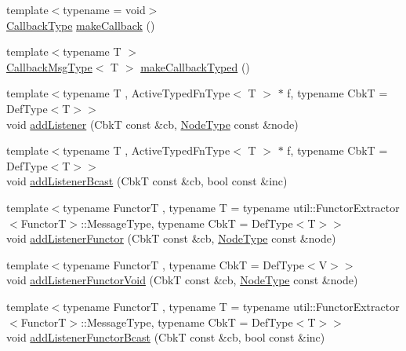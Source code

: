 \begin{DoxyCompactItemize}
\item 
{\footnotesize template$<$typename  = void$>$ }\\\hyperlink{structvt_1_1pipe_1_1_pipe_manager_t_l_a1cc1d0f1c80a36488f9b5d282e9755d2}{Callback\+Type} \hyperlink{structvt_1_1pipe_1_1_pipe_manager_t_l_aff965bd75d398d45ad11d33feeb7a7c5}{make\+Callback} ()
\item 
{\footnotesize template$<$typename T $>$ }\\\hyperlink{structvt_1_1pipe_1_1_pipe_manager_t_l_af6fc2c17f1729fa06450441b0ee81cb1}{Callback\+Msg\+Type}$<$ T $>$ \hyperlink{structvt_1_1pipe_1_1_pipe_manager_t_l_a9644742f82b43a851e8a20755302a2e0}{make\+Callback\+Typed} ()
\item 
{\footnotesize template$<$typename T , Active\+Typed\+Fn\+Type$<$ T $>$ $\ast$ f, typename CbkT  = Def\+Type$<$\+T$>$$>$ }\\void \hyperlink{structvt_1_1pipe_1_1_pipe_manager_t_l_a379d983dfbf654ed01281d96148175f3}{add\+Listener} (CbkT const \&cb, \hyperlink{namespacevt_a866da9d0efc19c0a1ce79e9e492f47e2}{Node\+Type} const \&node)
\item 
{\footnotesize template$<$typename T , Active\+Typed\+Fn\+Type$<$ T $>$ $\ast$ f, typename CbkT  = Def\+Type$<$\+T$>$$>$ }\\void \hyperlink{structvt_1_1pipe_1_1_pipe_manager_t_l_abf50654cc9c8823790a0bb8fe0d0024f}{add\+Listener\+Bcast} (CbkT const \&cb, bool const \&inc)
\item 
{\footnotesize template$<$typename FunctorT , typename T  = typename util\+::\+Functor\+Extractor$<$\+Functor\+T$>$\+::\+Message\+Type, typename CbkT  = Def\+Type$<$\+T$>$$>$ }\\void \hyperlink{structvt_1_1pipe_1_1_pipe_manager_t_l_abc9236c8ff7a657b1b04fd7604d616b9}{add\+Listener\+Functor} (CbkT const \&cb, \hyperlink{namespacevt_a866da9d0efc19c0a1ce79e9e492f47e2}{Node\+Type} const \&node)
\item 
{\footnotesize template$<$typename FunctorT , typename CbkT  = Def\+Type$<$\+V$>$$>$ }\\void \hyperlink{structvt_1_1pipe_1_1_pipe_manager_t_l_a12cd5abf9d9a082369419a5cc5b7b0f8}{add\+Listener\+Functor\+Void} (CbkT const \&cb, \hyperlink{namespacevt_a866da9d0efc19c0a1ce79e9e492f47e2}{Node\+Type} const \&node)
\item 
{\footnotesize template$<$typename FunctorT , typename T  = typename util\+::\+Functor\+Extractor$<$\+Functor\+T$>$\+::\+Message\+Type, typename CbkT  = Def\+Type$<$\+T$>$$>$ }\\void \hyperlink{structvt_1_1pipe_1_1_pipe_manager_t_l_a508e6625e15b9315a24af97670468802}{add\+Listener\+Functor\+Bcast} (CbkT const \&cb, bool const \&inc)

\end{DoxyCompactItemize}

